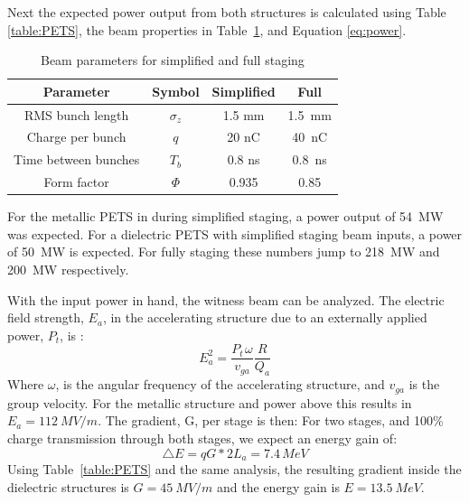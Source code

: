 Next the expected power output from both structures is calculated using Table \ref{table:PETS}, 
the beam properties in Table~\ref{table:beam1}, and Equation \ref{eq:power}. 
\begin{table}
	\begin{center}
		\caption{Beam parameters for simplified and full staging}
		\label{table:beam1}
		\begin{tabular}{cccc}  
			\toprule
			\toprule
			\textbf{Parameter} & \textbf{Symbol} & \textbf{Simplified} & \textbf{Full} \\
			\midrule
			RMS bunch length & $\sigma_{z}$ & 1.5 mm & \SI{1.5}{mm}\\  
			Charge per bunch & $q$ & 20 nC & \SI{40}{nC}\\  
			Time between bunches & $T_{b}$ & 0.8 ns & \SI{0.8}{ns}\\  
			Form factor 		 & $\Phi$ & 0.935 & \SI{0.85}{}\\  
			\bottomrule
		\end{tabular}
	\end{center}
\end{table}
For the metallic PETS in during simplified staging, a power output of \SI{54}{MW} was expected.
For a dielectric PETS with simplified staging beam inputs, a power of \SI{50}{MW} is expected.
For fully staging these numbers jump to \SI{218}{MW} and \SI{200}{MW} respectively. 

With the input power in hand, the witness beam can be analyzed. 
The electric field strength, $E_{a}$, in 
the accelerating structure due to an externally applied power,
$P_{t}$, is \cite{wangler}: 
\begin{equation}
E_{a}^{2}=\frac{P_{t\,}\omega}{v_{ga}}\frac{R}{Q_a}
\label{eq:electricfield}
\end{equation}
Where $\omega$, is the angular frequency of the accelerating structure,
and $v_{ga}$ is the group velocity. 
  For the metallic structure and power above this results in $E_a=\SI{112}{MV/m}$.
The gradient, G, per stage is then: 
For two stages, and 100\% charge transmission through both stages,
we expect an energy gain of: 
\begin{equation}
\triangle E=qG*2L_{a}=7.4\,MeV
\end{equation}
Using Table~\ref{table:PETS} and the same analysis, 
the resulting gradient inside the dielectric structures is
$G=\SI{45}{MV/m}$ and the energy gain is $E = \SI{13.5}{MeV}$.



